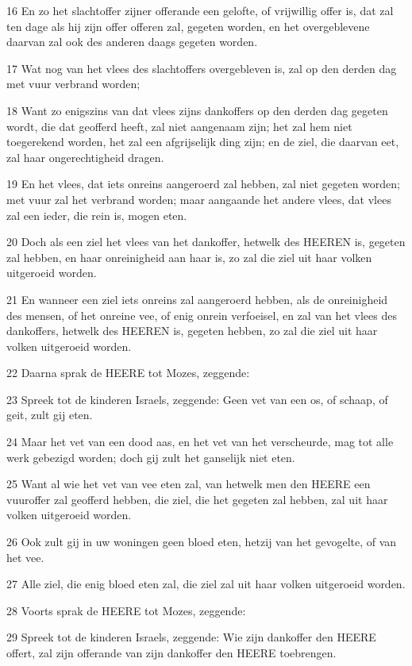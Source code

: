 \par 16 En zo het slachtoffer zijner offerande een gelofte, of vrijwillig offer is, dat zal ten dage als hij zijn offer offeren zal, gegeten worden, en het overgeblevene daarvan zal ook des anderen daags gegeten worden.
\par 17 Wat nog van het vlees des slachtoffers overgebleven is, zal op den derden dag met vuur verbrand worden;
\par 18 Want zo enigszins van dat vlees zijns dankoffers op den derden dag gegeten wordt, die dat geofferd heeft, zal niet aangenaam zijn; het zal hem niet toegerekend worden, het zal een afgrijselijk ding zijn; en de ziel, die daarvan eet, zal haar ongerechtigheid dragen.
\par 19 En het vlees, dat iets onreins aangeroerd zal hebben, zal niet gegeten worden; met vuur zal het verbrand worden; maar aangaande het andere vlees, dat vlees zal een ieder, die rein is, mogen eten.
\par 20 Doch als een ziel het vlees van het dankoffer, hetwelk des HEEREN is, gegeten zal hebben, en haar onreinigheid aan haar is, zo zal die ziel uit haar volken uitgeroeid worden.
\par 21 En wanneer een ziel iets onreins zal aangeroerd hebben, als de onreinigheid des mensen, of het onreine vee, of enig onrein verfoeisel, en zal van het vlees des dankoffers, hetwelk des HEEREN is, gegeten hebben, zo zal die ziel uit haar volken uitgeroeid worden.
\par 22 Daarna sprak de HEERE tot Mozes, zeggende:
\par 23 Spreek tot de kinderen Israels, zeggende: Geen vet van een os, of schaap, of geit, zult gij eten.
\par 24 Maar het vet van een dood aas, en het vet van het verscheurde, mag tot alle werk gebezigd worden; doch gij zult het ganselijk niet eten.
\par 25 Want al wie het vet van vee eten zal, van hetwelk men den HEERE een vuuroffer zal geofferd hebben, die ziel, die het gegeten zal hebben, zal uit haar volken uitgeroeid worden.
\par 26 Ook zult gij in uw woningen geen bloed eten, hetzij van het gevogelte, of van het vee.
\par 27 Alle ziel, die enig bloed eten zal, die ziel zal uit haar volken uitgeroeid worden.
\par 28 Voorts sprak de HEERE tot Mozes, zeggende:
\par 29 Spreek tot de kinderen Israels, zeggende: Wie zijn dankoffer den HEERE offert, zal zijn offerande van zijn dankoffer den HEERE toebrengen.
